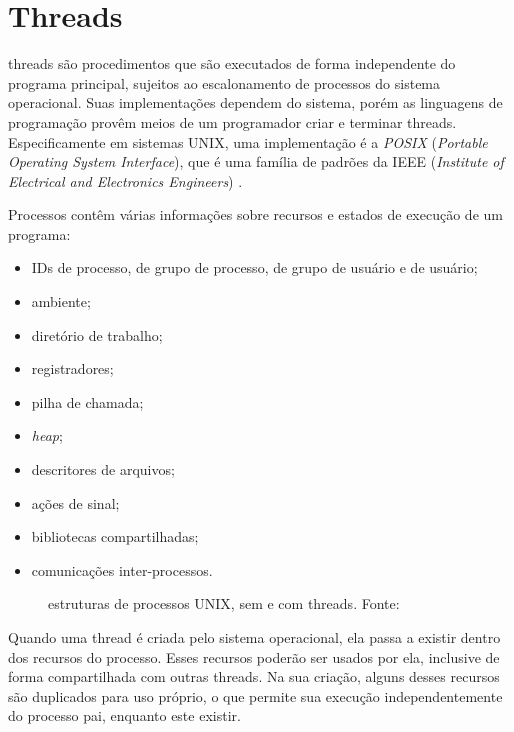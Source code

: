 
\section{Threads}

\Glspl{thread} são procedimentos que são executados de forma independente do programa
principal, sujeitos ao escalonamento de processos do sistema operacional. Suas
implementações dependem do sistema, porém as linguagens de programação provêm meios de
um programador criar e terminar \glspl*{thread}. Especificamente em sistemas UNIX, uma
implementação é a \emph{POSIX} (\emph{Portable Operating System Interface}),
que é uma família de padrões da IEEE (\emph{Institute of Electrical and Electronics
Engineers}) \cite{site:posixthread}.

Processos contêm várias informações sobre recursos e estados de execução de um programa:

\begin{itemize}
    \item IDs de processo, de grupo de processo, de grupo de usuário e de usuário;
    \item ambiente;
    \item diretório de trabalho;
    \item registradores;
    \item pilha de chamada;
    \item \emph{heap};
    \item descritores de arquivos;
    \item ações de sinal;
    \item bibliotecas compartilhadas;
    \item comunicações inter-processos.
\end{itemize}

\begin{figure}[H]
    \centering
    \caption{estruturas de processos UNIX, sem e com threads. Fonte:\cite{site:posixthread2}}
    \label{fig:threads}
\end{figure}

Quando uma \gls*{thread} é criada pelo sistema operacional, ela passa a existir dentro
dos recursos do processo. Esses recursos poderão ser usados por ela, inclusive de forma
compartilhada com outras \glspl*{thread}. Na sua criação, alguns desses recursos são
duplicados para uso próprio, o que permite sua execução independentemente do processo
pai, enquanto este existir.

